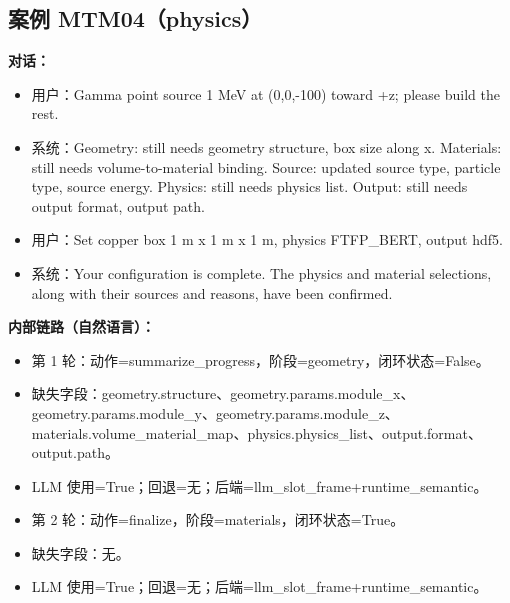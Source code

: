 \documentclass[11pt]{ctexart}
\begin{document}
\subsection{案例 MTM04（physics）}
\textbf{对话：}
\begin{itemize}
\item 用户：Gamma point source 1 MeV at (0,0,-100) toward +z; please build the rest.
\item 系统：Geometry: still needs geometry structure, box size along x. Materials: still needs volume-to-material binding. Source: updated source type, particle type, source energy. Physics: still needs physics list. Output: still needs output format, output path.
\item 用户：Set copper box 1 m x 1 m x 1 m, physics FTFP\_BERT, output hdf5.
\item 系统：Your configuration is complete. The physics and material selections, along with their sources and reasons, have been confirmed.
\end{itemize}
\textbf{内部链路（自然语言）：}
\begin{itemize}
\item 第 1 轮：动作=summarize\_progress，阶段=geometry，闭环状态=False。
\item 缺失字段：geometry.structure、geometry.params.module\_x、geometry.params.module\_y、geometry.params.module\_z、materials.volume\_material\_map、physics.physics\_list、output.format、output.path。
\item LLM 使用=True；回退=无；后端=llm\_slot\_frame+runtime\_semantic。
\item 第 2 轮：动作=finalize，阶段=materials，闭环状态=True。
\item 缺失字段：无。
\item LLM 使用=True；回退=无；后端=llm\_slot\_frame+runtime\_semantic。
\end{itemize}
\end{document}
